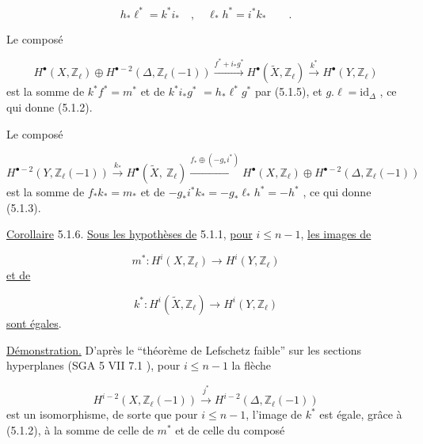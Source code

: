 \begin{equation}\tag{5.1.5}
h_*\ell^* = k^*i_* \quad , \quad \ell_*h^* = i^*k_* \qquad .
\end{equation}


Le composé

\begin{equation*}
H^{\bullet}(X,\mathbb{Z}_{\ell}) \oplus H^{\bullet-2}(\Delta,\mathbb{Z}_{\ell}(-1)) \stackrel{f^*+i_*g^*}{\longrightarrow} H^{\bullet}(\widetilde{X},\mathbb{Z}_{\ell}) \stackrel{k^*}{\longrightarrow} H^{\bullet}(Y,\mathbb{Z}_{\ell})
\end{equation*}
est la somme de $k^*f^* = m^*$ et de $k^*i_*g^*$ $= h_*\ell^*g^*$ par (5.1.5), et $g.\ell = \mathrm{id}_{\Delta}$ , ce qui donne (5.1.2).

Le composé

\begin{equation*}
H^{\bullet-2}(Y,\mathbb{Z}_{\ell}(-1)) \stackrel{k_*}{\longrightarrow} H^{\bullet}(\widetilde{X},\ \mathbb{Z}_{\ell}) \stackrel{f_*\oplus(-g_*i^*)}{\longrightarrow} H^{\bullet}(X,\mathbb{Z}_{\ell}) \oplus H^{\bullet-2}(\Delta,\mathbb{Z}_{\ell}(-1))
\end{equation*}
est la somme de $f_*k_* = m_*$ et de $-g_*i^*k_* = -g_*\ell_*h^* = -h^*$ ,
ce qui donne (5.1.3).

\underline{Corollaire} 5.1.6. \underline{Sous les hypothèses de} 5.1.1, \underline{pour} $i \leq n-1$, \underline{les images de}

\begin{equation*}
m^* : H^i(X,\mathbb{Z}_{\ell}) \longrightarrow H^i(Y,\mathbb{Z}_{\ell})
\end{equation*}
\underline{et de}

\begin{equation*}
k^* : H^i(\widetilde{X},\mathbb{Z}_{\ell}) \longrightarrow H^i(Y,\mathbb{Z}_{\ell})
\end{equation*}
\underline{sont égales}.

\underline{Démonstration.} D'après le ``théorème de Lefschetz faible'' sur les sections hyperplanes (SGA 5 VII 7.1  ), pour $i \leq n-1$ la flèche

\begin{equation}\tag{5.1.7}
H^{i-2}(X,\mathbb{Z}_{\ell}(-1)) \stackrel{j^*}{\longrightarrow} H^{i-2}(\Delta,\mathbb{Z}_{\ell}(-1))
\end{equation}
est un isomorphisme, de sorte que pour $i \leq n-1$, l'image de $k^*$ est égale, grâce à (5.1.2), à la somme de celle de $m^*$ et de celle du composé

